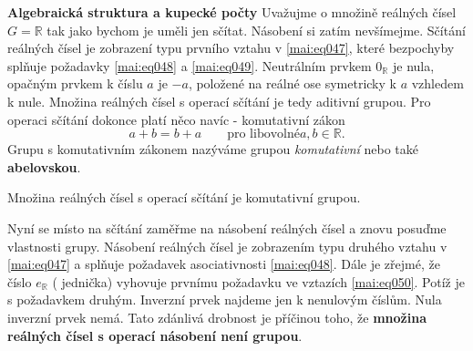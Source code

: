 \wikitextrule
\begin{example}\label{mai:exam047}
  \textbf{Algebraická struktura a kupecké počty}\newline\small
    Uvažujme o množině reálných čísel \(G = \mathbb{R}\) tak jako bychom je uměli jen 
    sčítat. Násobení si zatím nevšímejme. Sčítání reálných čísel je zobrazení typu prvního 
    vztahu v \ref{mai:eq047}, které bezpochyby splňuje požadavky \ref{mai:eq048} a 
    \ref{mai:eq049}. Neutrálním prvkem \(0_\mathbb{R}\) je  nula, opačným prvkem k 
    číslu \(a\) je \(-a\), položené na reálné ose symetricky k \(a\) vzhledem k nule. Množina 
    reálných čísel s operací sčítání je tedy aditivní grupou. Pro operaci sčítání dokonce platí 
    něco navíc - komutativní zákon
    \begin{equation}\label{mai:eq051}
      a + b = b + a \qquad\text{pro libovolné} a,b\in\mathbb{R}.
    \end{equation} 
    Grupu s komutativním zákonem nazýváme grupou \emph{komutativní} nebo také \textbf{abelovskou}.
    
    Množina reálných čísel s operací sčítání je komutativní grupou.
    
    Nyní se místo na sčítání zaměřme na násobení reálných čísel a znovu posuďme vlastnosti grupy. 
    Násobení reálných čísel je zobrazením typu druhého vztahu v \ref{mai:eq047} a splňuje požadavek 
    asociativnosti \ref{mai:eq048}. Dále je zřejmé, že číslo \(e_\mathbb{R}\) ( 
    jednička) vyhovuje prvnímu požadavku ve vztazích \ref{mai:eq050}. Potíž je s požadavkem druhým. 
    Inverzní prvek najdeme jen k nenulovým číslům. Nula inverzní prvek nemá. Tato zdánlivá drobnost 
    je příčinou toho, že \textbf{množina reálných čísel s operací násobení není grupou}.
  \normalsize
\end{example}